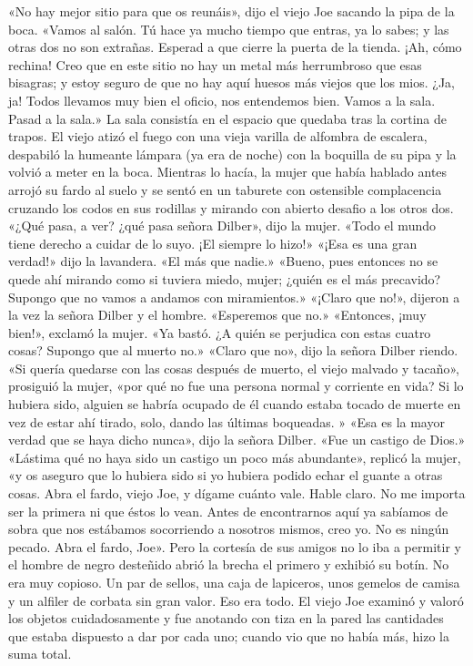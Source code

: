 \documentclass{novela}
\begin{document}
 «No hay mejor sitio para que os reunáis», dijo el viejo Joe sacando la pipa de la boca. «Vamos al salón. Tú hace ya mucho tiempo que entras, ya lo sabes; y las otras dos no son extrañas. Esperad a que cierre la puerta de la tienda. ¡Ah, cómo rechina! Creo que en este sitio no hay un metal más herrumbroso que esas bisagras; y estoy seguro de que no hay aquí huesos más viejos que los mios. ¿Ja, ja! Todos llevamos muy bien el oficio, nos entendemos bien. Vamos a la sala. Pasad a la sala.»
 La sala consistía en el espacio que quedaba tras la cortina de trapos. El viejo atizó el fuego con una vieja varilla de alfombra de escalera, despabiló la humeante lámpara (ya era de noche) con la boquilla de su pipa y la volvió a meter en la boca. Mientras lo hacía, la mujer que había hablado antes arrojó su fardo al suelo y se sentó en un taburete con ostensible complacencia cruzando los codos en sus rodillas y mirando con abierto desafio a los otros dos.
 «¿Qué pasa, a ver? ¿qué pasa señora Dilber», dijo la mujer. «Todo el mundo tiene derecho a cuidar de lo suyo. ¡El siempre lo hizo!»
 «¡Esa es una gran verdad!» dijo la lavandera. «El más que nadie.»
 «Bueno, pues entonces no se quede ahí mirando como si tuviera miedo, mujer; ¿quién es el más precavido? Supongo que no vamos a andamos con miramientos.»
 «¡Claro que no!», dijeron a la vez la señora Dilber y el hombre. «Esperemos que no.»
 «Entonces, ¡muy bien!», exclamó la mujer. «Ya bastó. ¿A quién se perjudica con estas cuatro cosas? Supongo que al muerto no.»
 «Claro que no», dijo la señora Dilber riendo.
 «Si quería quedarse con las cosas después de muerto, el viejo malvado y tacaño», prosiguió la mujer, «por qué no fue una persona normal y corriente en vida? Si lo hubiera sido, alguien se habría ocupado de él cuando estaba tocado de muerte en vez de estar ahí tirado, solo, dando las últimas boqueadas. »
 «Esa es la mayor verdad que se haya dicho nunca», dijo la señora Dilber. «Fue un castigo de Dios.»
 «Lástima qué no haya sido un castigo un poco más abundante», replicó la mujer, «y os aseguro que lo hubiera sido si yo hubiera podido echar el guante a otras cosas. Abra el fardo, viejo Joe, y dígame cuánto vale. Hable claro. No me importa ser la primera ni que éstos lo vean. Antes de encontrarnos aquí ya sabíamos de sobra que nos estábamos socorriendo a nosotros mismos, creo yo. No es ningún pecado. Abra el fardo, Joe».
 Pero la cortesía de sus amigos no lo iba a permitir y el hombre de negro desteñido abrió la brecha el primero y exhibió su botín. No era muy copioso. Un par de sellos, una caja de lapiceros, unos gemelos de camisa y un alfiler de corbata sin gran valor. Eso era todo. El viejo Joe examinó y valoró los objetos cuidadosamente y fue anotando con tiza en la pared las cantidades que estaba dispuesto a dar por cada uno; cuando vio que no había más, hizo la suma total.
\end{document}
